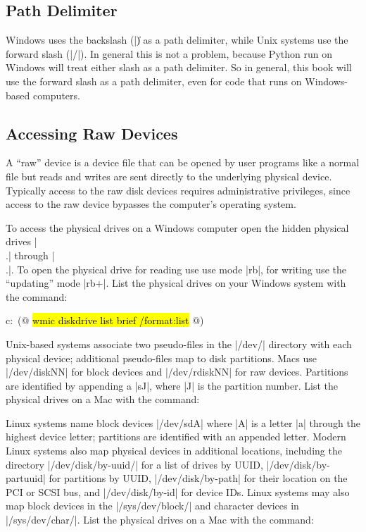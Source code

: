 \subsection{Path Delimiter}
Windows uses the backslash (|\|) as a path delimiter, while Unix
systems use the forward slash (|/|). In general this is not a problem,
because Python run on Windows will treat either slash as a path
delimiter. So in general, this book will use the forward slash as a
path delimiter, even for code that runs on Windows-based computers.

\subsection{Accessing Raw Devices}

A ``raw'' device is a device file that can be opened by user programs
like a normal file but reads and writes are sent directly to the
underlying physical device. Typically access to the raw disk devices 
requires administrative privileges, since access to the raw device
bypasses the computer's operating system.

To access the physical drives on a Windows computer open the hidden
physical drives |\\.| through
|\\.\PhysicalDriveNN|. To open the physical drive for reading use use
mode |rb|, for writing use the ``updating'' mode |rb+|. List the
physical drives on your Windows system with the command:

\begin{code}
c:\ (@ \hl{wmic diskdrive list brief /format:list} @)
\end{code}

Unix-based systems associate two pseudo-files in the |/dev/| directory with
each physical device; additional pseudo-files map to disk
partitions. Macs use |/dev/diskNN| for block devices and
|/dev/rdiskNN| for raw devices. Partitions are identified by appending
a |sJ|, where |J| is the partition number.  List the physical drives
on a Mac with the command:


Linux systems name block devices |/dev/sdA| where |A| is a letter |a|
through the highest device letter; partitions are identified with an
appended letter. Modern Linux systems also map physical devices in
additional locations, including the directory |/dev/disk/by-uuid/| for
a list of drives by UUID, |/dev/disk/by-partuuid| for partitions by
UUID, |/dev/disk/by-path| for their location on the PCI or SCSI bus,
and |/dev/disk/by-id| for device IDs. Linux systems may also map
block devices in the |/sys/dev/block/| and character devices in
|/sys/dev/char/|. List the physical drives
on a Mac with the command:

